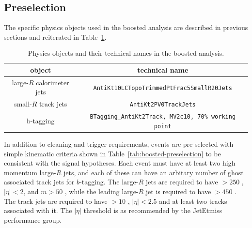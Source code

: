 \subsection{Preselection}
The specific physics objects used in the boosted analysis are described in previous sections and reiterated in Table~\ref{tab:boosted-objects}.

\begin{table}[bhp]
\begin{center}
\begin{tabular}{c|c}
  object & technical name \\
  \hline
  large-$R$ calorimeter jets & \texttt{AntiKt10LCTopoTrimmedPtFrac5SmallR20Jets} \\
  small-$R$ track jets       & \texttt{AntiKt2PV0TrackJets} \\
  b-tagging                  & \texttt{BTagging\_AntiKt2Track, MV2c10, 70\% working point} \\
\end{tabular}
\caption{Physics objects and their technical names in the boosted analysis.} %
\label{tab:boosted-objects}
\end{center}
\end{table}

In addition to cleaning and trigger requirements, events are pre-selected with simple kinematic criteria shown in Table~\ref{tab:boosted-preselection} to be consistent with the signal hypotheses. Each event must have at least two high momentum large-$R$ jets, and each of these can have an arbitary number of ghost associated track jets for $b$-tagging. The large-$R$ jets are required to have \pt $>  250 $ \GeV , $|\eta| < 2$,  and $m > 50$ \GeV, while the leading large-$R$ jet is required to have \pt $> 450$ \GeV. The track jets are required to have \pt $> 10 $ \GeV , $|\eta| < 2.5$ and at least two tracks associated with it. The $|\eta|$ threshold is as recommended by the JetEtmiss performance group. 

